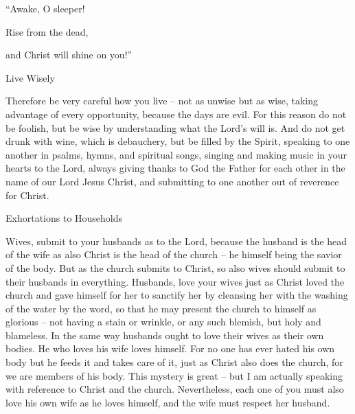 {\par }{\Q “Awake,
O sleeper!

\par }{\Q Rise
from
the dead,
\par }{\Q and
Christ
will shine
on you!”
\par }{\SH Live Wisely
\par }{\PP {}Therefore
be
very
careful
how
you live
– not
as
unwise
but
as
wise,
taking advantage
of every opportunity,
because
the days
are
evil.
For
this reason
do
not
be
foolish,
but
be wise by understanding
what
the Lord’s
will is.
And
do
not
get drunk
with wine,
which
is
debauchery,
but
be filled
by
the Spirit,
speaking
to one another
in psalms,
hymns,
and
spiritual
songs,
singing
and
making music
in your
hearts
to the Lord,
always
giving thanks
to God
the Father
for
each other
in
the name
of our
Lord
Jesus
Christ,
and submitting to
one another
out of
reverence
for Christ.
\par }{\SH Exhortations to Households
\par }{\PP {}Wives,
submit to your
husbands
as
to the Lord,
because
the husband
is
the head
of the wife
as
also
Christ
is the head
of the church
– he himself
being the savior
of the body.
But
as
the church
submits
to Christ,
so
also
wives
should submit to their husbands
in
everything.
Husbands,
love
your wives
just as
Christ
loved
the church
and
gave
himself
for
her
to sanctify
her
by cleansing
her with the washing
of the water
by
the word,
so that
he
may present
the church
to himself
as glorious
– not
having
a stain
or
wrinkle,
or
any
such blemish,
but
holy
and
blameless.
In the same way
husbands
ought
to love
their
wives
as
their own
bodies.
He who loves
his
wife
loves
himself.
For
no one
has ever
hated
his own
body
but
he feeds
it and
takes care
of it,
just as
Christ
also does the church,
for
we are
members
of his
body.
{}
This
mystery
is
great
– but
I
am actually speaking
with reference to
Christ
and
the church.
Nevertheless,
each
one
of you
must also
love
his own
wife
as
he loves himself,
and
the wife
must respect
her husband.

}
